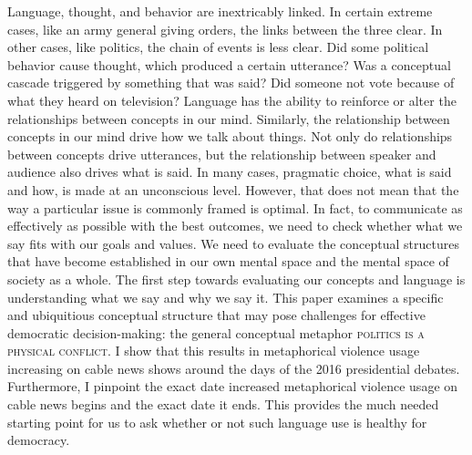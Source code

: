 Language, thought, and behavior are inextricably linked. In certain extreme
cases, like an army general giving orders, the links between the three clear. 
In other cases, like politics, the chain of events is less clear. Did some
political behavior cause thought, which produced a certain utterance? Was a
conceptual cascade triggered by something that was said? Did someone not vote
because of what they heard on television? Language has the ability to reinforce
or alter the relationships between concepts in our mind. Similarly, the relationship
between concepts in our mind drive how we talk about things. Not only do
relationships between concepts drive utterances, but the relationship between
speaker and audience also drives what is said. In many cases, pragmatic choice,
what is said and how, is made at an unconscious level. However, that does not mean
that the way a particular issue is commonly framed is optimal. In fact, to 
communicate as effectively as possible with the best outcomes, we need to check
whether what we say fits with our goals and values. We need to evaluate the
conceptual structures that have become established in our own mental space and
the mental space of society as a whole. The first step towards evaluating
our concepts and language is understanding what we say and why we say it. 
This paper examines a specific and ubiquitious conceptual structure that may
pose challenges for effective democratic decision-making: the general conceptual metaphor
\textsc{politics is a physical conflict}. I show that this results in metaphorical
violence usage increasing on cable news shows around the days of the 2016 
presidential debates. Furthermore, I pinpoint the exact date increased metaphorical
violence usage on cable news begins and the exact date it ends. This provides
the much needed starting point for us to ask whether or not such language
use is healthy for democracy.

